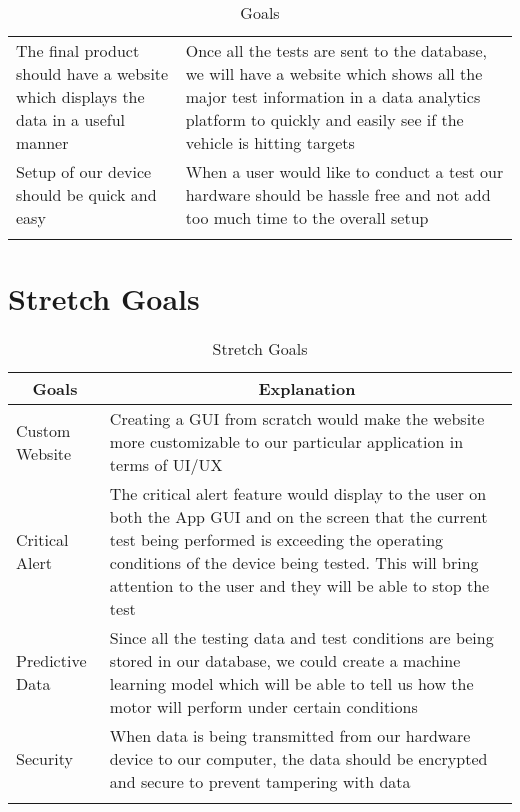\documentclass[12pt]{article}
\begin{document}
\begin{longtable}{|p{6cm}|p{10cm}|}
    \newline                                
    \\ \hline
    The final product should have a website which displays the data in a useful manner                                
    & Once all the  tests are sent to the database, we will have a website which shows all the major test information in a data analytics platform to quickly and easily see if the vehicle is hitting targets  
    \newline                              
    \\ \hline
    Setup of our device should be quick and easy                               
    & When a user would like to conduct a test our hardware should be hassle free and not add too much time to the overall setup
    \newline                            
    \\ \hline
    \caption{Goals}
    \end{longtable}
  
    
\section{Stretch Goals}
    \begin{longtable}{|p{6cm}|p{10cm}|}
        
        \hline
        \multicolumn{1}{|c|}{\textbf{Goals}} & \multicolumn{1}{c|}{\textbf{Explanation}} 
        \\ \hline
        Custom Website
        &  Creating a GUI from scratch would make the website more customizable to our particular application in terms of UI/UX   
        \newline                              
        \\ \hline
        Critical Alert                              
        & The critical alert feature would display to the user on both the App GUI and on the screen that the current test being performed is exceeding the operating conditions of the device being tested. This will bring attention to the user and they will be able to stop the test
        \newline
        \\ \hline
        Predictive Data                              
        & Since all the testing data and test conditions are being stored in our database, we could create a machine learning model which will be able to tell us how the motor will perform under certain conditions                         
        \newline       
        \\ \hline
        Security                              
        & When data is being transmitted from our hardware device to our computer, the data should be encrypted and secure to prevent tampering with data
        \newline                           
        \\ 
        \hline
        \caption{Stretch Goals}
    \end{longtable}
\end{document}
